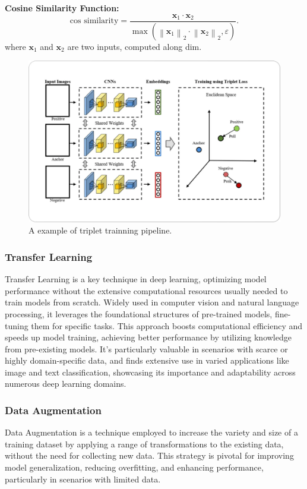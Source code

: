 \documentclass[10pt,twocolumn,letterpaper]{article}
\begin{document}
\noindent\textbf{Cosine Similarity Function:}\\
\[
\text{cos similarity} = \frac{\mathbf{x}_1 \cdot \mathbf{x}_2}{\max\left(\left\| \mathbf{x}_1 \right\|_2 \cdot \left\| \mathbf{x}_2 \right\|_2, \varepsilon\right)}.
\]
where \( \mathbf{x}_1 \) and \( \mathbf{x}_2 \) are two inputs, computed along dim.\\

\begin{figure}[h]
	\centering
	\includegraphics[width=\columnwidth,height=0.5\columnwidth]{triplet}
	\caption{A example of triplet trainning pipeline\cite{hermans2017defense}.}
	\label{fig:triplet}
\end{figure}

\subsubsection{Transfer Learning}
Transfer Learning\cite{weiss2016survey, zhuang2020comprehensive} is a key technique in deep learning, optimizing model performance without the extensive computational resources usually needed to train models from scratch. Widely used in computer vision and natural language processing, it leverages the foundational structures of pre-trained models, fine-tuning them for specific tasks\cite{weiss2016survey, zhuang2020comprehensive, simonyan2014very, he2016deep, tan2019efficientnet, dosovitskiy2020image, liu2021swin, liu2022swin}. This approach boosts computational efficiency and speeds up model training, achieving better performance by utilizing knowledge from pre-existing models. It's particularly valuable in scenarios with scarce or highly domain-specific data, and finds extensive use in varied applications like image and text classification, showcasing its importance and adaptability across numerous deep learning domains.

\subsubsection{Data Augmentation}
Data Augmentation is a technique employed to increase the variety and size of a training dataset by applying a range of transformations to the existing data, without the need for collecting new data. This strategy is pivotal for improving model generalization, reducing overfitting, and enhancing performance, particularly in scenarios with limited data.
\end{document}
